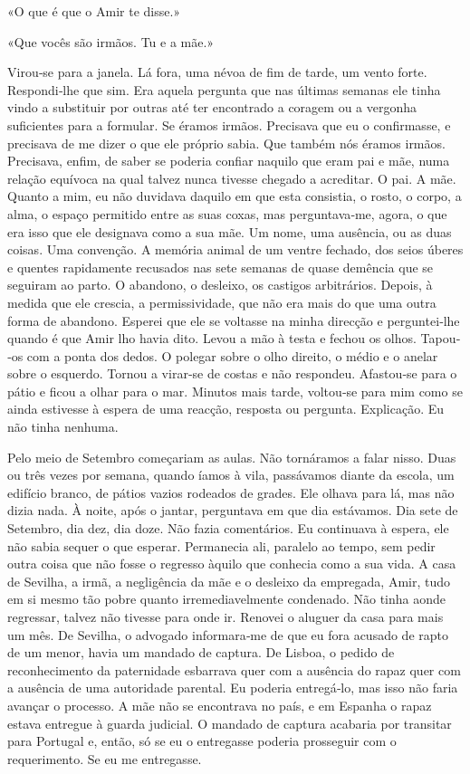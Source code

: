 «O que é que o Amir te disse.»

«Que vocês são irmãos. Tu e a mãe.»

Virou­‑se para a janela. Lá fora, uma névoa de fim de tarde, um vento
forte. Respondi­‑lhe que sim. Era aquela pergunta que nas últimas
semanas ele tinha vindo a substituir por outras até ter encontrado a
coragem ou a vergonha suficientes para a formular. Se éramos irmãos.
Precisava que eu o confirmasse, e precisava de me dizer o que ele
próprio sabia. Que também nós éramos irmãos. Precisava, enfim, de saber
se poderia confiar naquilo que eram pai e mãe, numa relação equívoca na
qual talvez nunca tivesse chegado a acreditar. O pai. A mãe. Quanto a
mim, eu não duvidava daquilo em que esta consistia, o rosto, o corpo, a
alma, o espaço permitido entre as suas coxas, mas perguntava­‑me, agora,
o que era isso que ele designava como a sua mãe. Um nome, uma ausência,
ou as duas coisas. Uma convenção. A memória animal de um ventre fechado,
dos seios úberes e quentes rapidamente recusados nas sete semanas de
quase demência que se seguiram ao parto. O abandono, o desleixo, os
castigos arbitrários. Depois, à medida que ele crescia, a
permissividade, que não era mais do que uma outra forma de abandono.
Esperei que ele se voltasse na minha direcção e perguntei­‑lhe quando é
que Amir lho havia dito. Levou a mão à testa e fechou os olhos.
Tapou­‑os com a ponta dos dedos. O polegar sobre o olho direito, o médio
e o anelar sobre o esquerdo. Tornou a virar­‑se de costas e não
respondeu. Afastou­‑se para o pátio e ficou a olhar para o mar. Minutos
mais tarde, voltou­‑se para mim como se ainda estivesse à espera de uma
reacção, resposta ou pergunta. Explicação. Eu não tinha nenhuma.

Pelo meio de Setembro começariam as aulas. Não tornáramos a falar nisso.
Duas ou três vezes por semana, quando íamos à vila, passávamos diante da
escola, um edifício branco, de pátios vazios rodeados de grades. Ele
olhava para lá, mas não dizia nada. À noite, após o jantar, perguntava
em que dia estávamos. Dia sete de Setembro, dia dez, dia doze. Não fazia
comentários. Eu continuava à espera, ele não sabia sequer o que esperar.
Permanecia ali, paralelo ao tempo, sem pedir outra coisa que não fosse o
regresso àquilo que conhecia como a sua vida. A casa de Sevilha, a irmã,
a negligência da mãe e o desleixo da empregada, Amir, tudo em si mesmo
tão pobre quanto irremediavelmente condenado. Não tinha aonde regressar,
talvez não tivesse para onde ir. Renovei o aluguer da casa para mais um
mês. De Sevilha, o advogado informara­‑me de que eu fora acusado de
rapto de um menor, havia um mandado de captura. De Lisboa, o pedido de
reconhecimento da paternidade esbarrava quer com a ausência do rapaz
quer com a ausência de uma autoridade parental. Eu poderia entregá­‑lo,
mas isso não faria avançar o processo. A mãe não se encontrava no país,
e em Espanha o rapaz estava entregue à guarda judicial. O mandado de
captura acabaria por transitar para Portugal e, então, só se eu o
entregasse poderia prosseguir com o requerimento. Se eu me entregasse.

